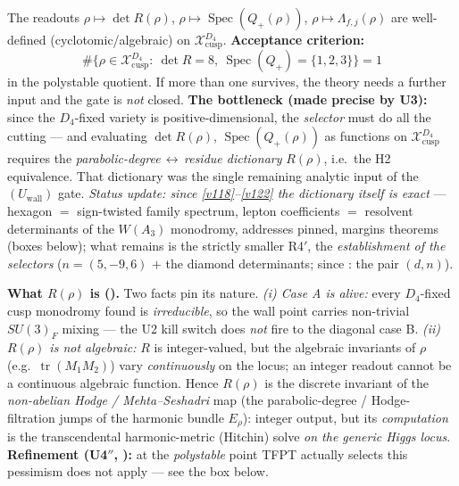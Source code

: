 \begin{lemma}
The readouts $\rho\mapsto\det R(\rho)$, $\rho\mapsto\operatorname{Spec}(Q_+(\rho))$,
$\rho\mapsto\Lambda_{f,j}(\rho)$ are well-defined (cyclotomic/algebraic) on
$\mathcal X_{\mathrm{cusp}}^{D_4}$. \textbf{Acceptance criterion:}
\[
  \#\{\rho\in\mathcal X_{\mathrm{cusp}}^{D_4}:\ \det R=8,\ \operatorname{Spec}(Q_+)=\{1,2,3\}\}=1
\]
in the polystable quotient. If more than one survives, the theory needs a further input and the gate is
\emph{not} closed. \textbf{The bottleneck (made precise by U3):} since the $D_4$-fixed variety is
positive-dimensional, the \emph{selector} must do all the cutting --- and evaluating $\det R(\rho)$,
$\operatorname{Spec}(Q_+(\rho))$ as functions on $\mathcal X_{\mathrm{cusp}}^{D_4}$ requires the
\emph{parabolic-degree\,$\leftrightarrow$\,residue dictionary} $R(\rho)$, i.e.\ the H2 equivalence. That
dictionary was the single remaining analytic input of the $(U_{\mathrm{wall}})$ gate. \emph{Status update:
since \vref{v118}--\vref{v122} the dictionary itself is exact} --- hexagon $=$ sign-twisted family spectrum, lepton
coefficients $=$ resolvent determinants of the $W(A_3)$ monodromy, addresses pinned, margins theorems
(boxes below); what remains is the strictly smaller R4$'$, the \emph{establishment of the selectors}
($n=(5,-9,6)$ $+$ the diamond determinants; since : the pair $(d,n)$).

\textbf{What $R(\rho)$ is ().} Two facts pin its nature. \emph{(i) Case A is
alive:} every $D_4$-fixed cusp monodromy found is \emph{irreducible}, so the wall point carries
non-trivial $SU(3)_F$ mixing --- the U2 kill switch does \emph{not} fire to the diagonal case B.
\emph{(ii) $R(\rho)$ is not algebraic:} $R$ is integer-valued, but the algebraic invariants of $\rho$
(e.g.\ $\operatorname{tr}(M_1M_2)$) vary \emph{continuously} on the locus; an integer readout cannot be a
continuous algebraic function. Hence $R(\rho)$ is the discrete invariant of the \emph{non-abelian Hodge /
Mehta--Seshadri} map (the parabolic-degree / Hodge-filtration jumps of the harmonic bundle $E_\rho$):
integer output, but its \emph{computation} is the transcendental harmonic-metric (Hitchin) solve \emph{on
the generic Higgs locus}. \textbf{Refinement (U4$''$, ):} at the
\emph{polystable} point TFPT actually selects this pessimism does not apply --- see the box below.
\end{lemma}

